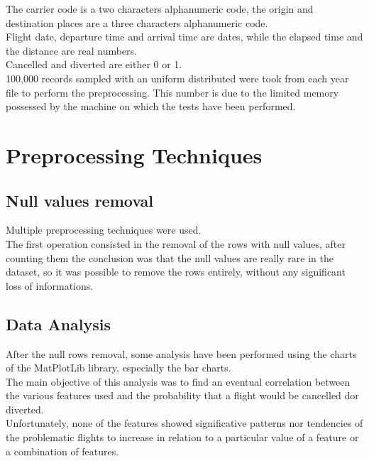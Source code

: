 \documentclass[
	letterpaper, %
	10pt, %
]{class}
\begin{document}
The carrier code is a two characters alphanumeric code, the origin and destination places are a three characters alphanumeric code.\\
Flight date, departure time and arrival time are dates, while the elapsed time and the distance are real numbers.\\
Cancelled and diverted are either 0 or 1.\\

100,000 records sampled with an uniform distributed were took from each year file to perform the preprocessing. This number is due to the limited memory
possessed by the machine on which the tests have been performed.


\section{Preprocessing Techniques}

\subsection{Null values removal}

Multiple preprocessing techniques were used.\\

The first operation consisted in the removal of the rows with null values, after counting them the conclusion was that the null values are really rare in the dataset, so it was possible to remove the rows entirely, without any significant loss of informations.\\

\subsection{Data Analysis}
After the null rows removal, some analysis have been performed using the charts of the MatPlotLib library, especially the bar charts.\\
The main objective of this analysis was to find an eventual correlation between the various features used and the probability that a flight would be cancelled dor diverted.\\

Unfortunately, none of the features showed significative patterns nor tendencies of the problematic flights to increase in relation to a particular value of a feature or a combination of features.\\
\end{document}
